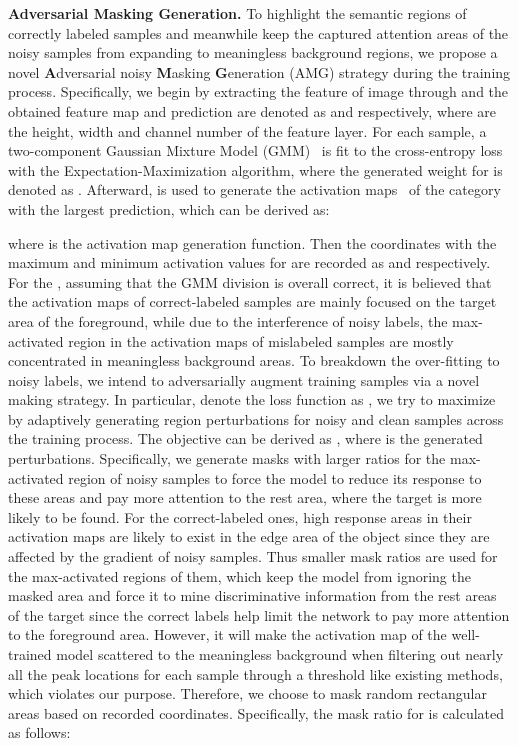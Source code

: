 \documentclass[10pt,twocolumn,letterpaper]{article}
\begin{document}
\textbf{Adversarial Masking Generation.} To highlight the semantic regions of correctly labeled samples and meanwhile keep the captured attention areas of the noisy samples from expanding to meaningless background regions, we propose a novel \textbf{A}dversarial noisy \textbf{M}asking \textbf{G}eneration (AMG) strategy during the training process. Specifically, we begin by extracting the feature of image  through  and the obtained feature map and prediction are denoted as  and  respectively, where  are the height, width and channel number of the feature layer. For each sample, a two-component Gaussian Mixture Model (GMM)~\cite{permuter2006study} is fit to the cross-entropy loss with the Expectation-Maximization algorithm, where the generated weight for  is denoted as . Afterward,  is used to generate the activation maps~\cite{gradCAM}  of the category with the largest prediction, which can be derived as:

where  is the activation map generation function. Then the coordinates with the maximum and minimum activation values for  are recorded as  and  respectively. For the , assuming that the GMM division is overall correct, it is believed that the activation maps of correct-labeled samples are mainly focused on the target area of the foreground, while due to the interference of noisy labels, the max-activated region in the activation maps of mislabeled samples are mostly concentrated in meaningless background areas. 
{To breakdown the over-fitting to noisy labels, we intend to adversarially augment training samples via a novel making strategy. In particular, denote the loss function as , we try to maximize  by adaptively generating region perturbations for noisy and clean samples across the training process. The objective can be derived as , where  is the generated perturbations. }
Specifically, we generate masks with larger ratios for the max-activated region of noisy samples to force the model to reduce its response to these areas and pay more attention to the rest area, where the target is more likely to be found. For the correct-labeled ones, high response areas in their activation maps are likely to exist in the edge area of the object since they are affected by the gradient of noisy samples. Thus smaller mask ratios are used for the max-activated regions of them, which keep the model from ignoring the masked area and force it to mine discriminative information from the rest areas of the target since the correct labels help limit the network to pay more attention to the foreground area. However, it will make the activation map of the well-trained model scattered to the meaningless background when filtering out nearly all the peak locations for each sample through a threshold like existing methods, which violates our purpose. Therefore, we choose to mask random rectangular areas based on recorded coordinates. Specifically, the mask ratio  for  is calculated as follows:
\end{document}
